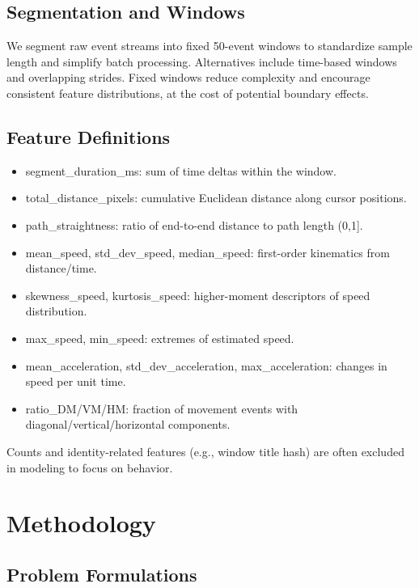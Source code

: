 \documentclass[
  12pt,
]{article}
\providecommand{\tightlist}{%
  \setlength{\itemsep}{0pt}\setlength{\parskip}{0pt}}
\begin{document}
\subsection{Segmentation and Windows}\label{segmentation-and-windows}

We segment raw event streams into fixed 50-event windows to standardize
sample length and simplify batch processing. Alternatives include
time-based windows and overlapping strides. Fixed windows reduce
complexity and encourage consistent feature distributions, at the cost
of potential boundary effects.

\subsection{Feature Definitions}\label{feature-definitions}

\begin{itemize}
\tightlist
\item
  segment\_duration\_ms: sum of time deltas within the window.
\item
  total\_distance\_pixels: cumulative Euclidean distance along cursor
  positions.
\item
  path\_straightness: ratio of end-to-end distance to path length
  (0,1{]}.
\item
  mean\_speed, std\_dev\_speed, median\_speed: first-order kinematics
  from distance/time.
\item
  skewness\_speed, kurtosis\_speed: higher-moment descriptors of speed
  distribution.
\item
  max\_speed, min\_speed: extremes of estimated speed.
\item
  mean\_acceleration, std\_dev\_acceleration, max\_acceleration: changes
  in speed per unit time.
\item
  ratio\_DM/VM/HM: fraction of movement events with
  diagonal/vertical/horizontal components.
\end{itemize}

Counts and identity-related features (e.g., window title hash) are often
excluded in modeling to focus on behavior.

\section{Methodology}\label{methodology}

\subsection{Problem Formulations}\label{problem-formulations}
\end{document}
